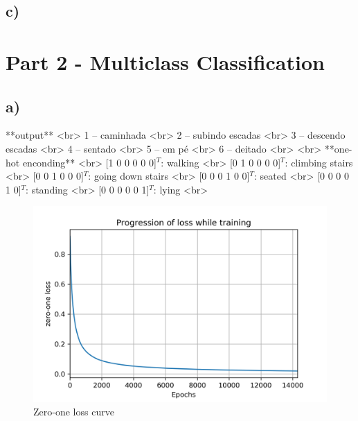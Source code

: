 \documentclass[a4paper]{article}
\begin{document}
\subsection{c) }

\paragraph{}

\section{Part 2 - Multiclass Classification}

\subsection{a) }

**output** <br>
1 – caminhada <br>
2 – subindo escadas <br>
3 – descendo escadas <br>
4 – sentado <br>
5 – em pé <br>
6 – deitado <br>
<br>
**one-hot enconding** <br>
[1 0 0 0 0 0]$^T$: walking <br>
[0 1 0 0 0 0]$^T$: climbing stairs <br>
[0 0 1 0 0 0]$^T$: going down stairs <br>
[0 0 0 1 0 0]$^T$: seated <br>
[0 0 0 0 1 0]$^T$: standing <br>
[0 0 0 0 0 1]$^T$: lying <br>

\begin{figure}[H]
    \centering
    \includegraphics[width=12cm]{zero_one_loss}
    \caption{Zero-one loss curve}
    \label{fig:ex2-a-zero_one_loss}
\end{figure}
\end{document}
